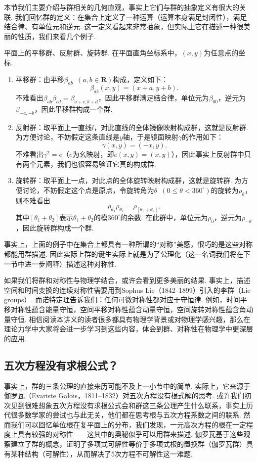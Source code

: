 本节我们主要介绍与群相关的几何直观，事实上它们与群的抽象定义有很大的关联. 我们回忆群的定义：在集合上定义了一种运算（运算本身满足封闭性），满足结合律、有单位元和逆元. 这一定义看起来非常抽象，但实际上它在描述一种很美丽的性质，我们来看几个例子.

\begin{example}
    平面上的平移群、反射群、旋转群. 在平面直角坐标系中，$(x,y)$为任意点的坐标.
    \begin{enumerate}
        \item 平移群：由平移$\beta_{ab}\enspace(a,b\in\mathbf{R})$构成，定义如下：
              \[\beta_{ab}(x,y)=(x+a,y+b).\]
              不难看出$\beta_{ab}\beta_{cd}=\beta_{a+c,b+d}$，因此平移群满足结合律，单位元为$\beta_{00}$，逆元为$\beta_{-a,-b}$，因此平移群构成一个群.

        \item 反射群：取平面上一直线$l$，对此直线的全体镜像映射构成群，这就是反射群. 为方便讨论，不妨假定这条直线是$y$轴，于是镜面映射$\gamma$的作用如下：
              \[\gamma(x,y)=(-x,y).\]
              不难看出$\gamma^2=e$（$e$为幺映射，即$e(x,y)=(x,y)$），因此事实上反射群中只有两个元素，我们也很容易验证它真的构成群.

        \item 旋转群：取平面上一点，对此点的全体旋转映射构成群，这就是旋转群. 为方便讨论，不妨假定这个点是原点，令旋转角为$\theta\enspace(0\leqslant\theta<360^\circ)$的旋转为$\rho_\theta$，则不难看出
              \[\rho_{\theta_1}\rho_{\theta_2}=\rho_{[\theta_1+\theta_2]},\]
              其中$[\theta_1+\theta_2]$表示$\theta_1+\theta_2$的模$360^\circ$的余数. 在此群中，单位元为$\rho_0$，逆元为$\rho_{-\theta}$，因此旋转群构成一个群.
    \end{enumerate}
\end{example}

事实上，上面的例子中在集合上都具有一种所谓的``对称''美感，很巧的是这些对称都能用群描述. 因此实际上群的诞生实际上就是为了公理化（这一名词我们将在下一节中进一步阐释）描述这种对称性.

如果我们将群和对称性与物理学结合，或许会看到更多美丽的结果. 事实上，描述空间和时间变换的连续对称性需要用到Sophus Lie（1842--1899）引入的李群（Lie groups）. 而诺特定理告诉我们：任何可微对称性都对应于守恒律. 例如，时间平移对称性蕴含能量守恒，空间平移对称性蕴含动量守恒，空间旋转对称性蕴含角动量守恒. 相信阅读本讲义的读者很多都具有物理学背景或对物理学感兴趣，那么在理论力学中大家将会进一步学习到这些内容，体会到群、对称性在物理学中更深层的应用.

\subsection{五次方程没有求根公式？}
事实上，群的三条公理的直接来历可能不及上一小节中的简单. 实际上，它来源于伽罗瓦（Evariste Galois，1811--1832）对五次方程没有根式解的思考. 或许我们初次见到很难想象五次方程没有求根公式会和群这三条公理产生什么联系，事实上历代很多数学家的尝试也与此无关，他们都在思考根与五次方程系数之间的联系. 然而我们可以回忆单位根在复平面上的分布，我们发现，一元高次方程的根在一定程度上具有较强的对称性——这其中的奥秘似乎可以用群来描述. 伽罗瓦基于这些观察建立了群的概念，证明了多项式可解性等价于多项式根的置换群（伽罗瓦群）具有某种结构（可解性），从而解决了5次方程不可解性这一难题.


